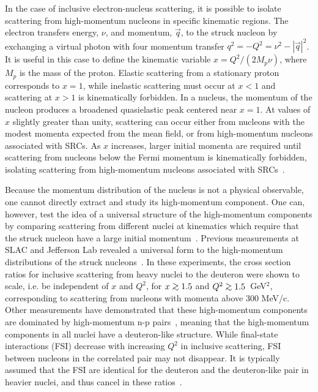 \documentclass[aps,prl,superscriptaddress,showpacs,twocolumn,floatfix,amsmath,amssymb]{revtex4-1}
\def\gtorder{\mathrel{\raise.3ex\hbox{$>$}\mkern-14mu
\lower0.6ex\hbox{$\sim$}}}
\begin{document}
In the case of inclusive electron-nucleus scattering, it is possible to isolate scattering from high-momentum
nucleons in specific kinematic regions. The electron transfers energy, $\nu$, and momentum, $\vec{q}$,
to the struck nucleon by exchanging a virtual photon with four momentum transfer $q^2=-Q^2=\nu^2-|\vec{q}|^2$.
It is useful in this case to define the kinematic variable $x = Q^2/(2M_p\nu)$, where $M_p$
is the mass of the proton. Elastic scattering from a stationary proton corresponds to $x=1$,
while inelastic scattering must occur at $x<1$ and scattering at $x>1$ is kinematically forbidden.
In a nucleus, the momentum of the nucleon produces a broadened quasielastic peak centered near $x=1$.
At values of $x$ slightly greater than unity, scattering can occur either from nucleons with the modest
momenta expected from the mean field, or from high-momentum nucleons associated with SRCs. As $x$
increases, larger initial momenta are required until scattering from nucleons below the Fermi
momentum is kinematically forbidden, isolating scattering from high-momentum nucleons associated with
SRCs~\cite{RevModPhys.80.189, PhysRevC.53.1689, src_john, egiyan2003}.

Because the momentum distribution of the nucleus is not a physical observable, one cannot directly extract
and study its high-momentum component. One can, however, test the idea of a universal structure of the
high-momentum components by comparing scattering from different nuclei at kinematics which require that the
struck nucleon have a large initial momentum~\cite{RevModPhys.80.189}. Previous measurements at SLAC and
Jefferson Lab revealed a universal form to the high-momentum distributions of the struck
nucleons~\cite{SLAC_Measurement_PRC.48.2451, egiyan2003, PhysRevLett.96.082501, fomin2012, src_john,
arrington99, arrington01}. In these experiments, the cross section ratios for inclusive scattering from
heavy nuclei to the deuteron were shown to scale, i.e. be independent of $x$ and $Q^2$, for $x \gtorder 1.5$
and $Q^2 \gtorder 1.5$~GeV$^2$, corresponding to scattering from nucleons with momenta above 300 MeV/c.
Other measurements have demonstrated that these high-momentum components are dominated by high-momentum n-p
pairs~\cite{aclander99, tang03, Subedi13062008, korover2014, hen14_science, piasetzky06}, meaning that the high-momentum
components in all nuclei have a deuteron-like structure. While final-state interactions (FSI)
decrease with increasing $Q^2$ in inclusive scattering, FSI between nucleons in the correlated pair may not
disappear. It is typically assumed that the FSI are identical for the deuteron and the deuteron-like pair in
heavier nuclei, and thus cancel in these ratios~\cite{RevModPhys.80.189, src_john}.
\end{document}
